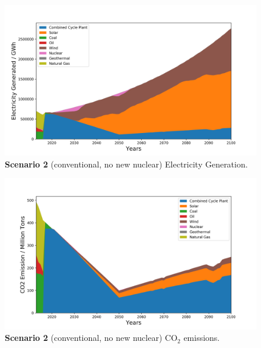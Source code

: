 \documentclass[final]{beamer}
\newlength{\onecolwid}
\begin{document}
\begin{frame}[t]
\begin{columns}
\begin{column}{\onecolwid}
\begin{figure}[H] 
\centering
\includegraphics[scale=1.1]{./plots/convNoNuc_ele.png}
\caption{\textbf{Scenario 2} (conventional, no new nuclear) Electricity Generation.}
\label{s2e}
\end{figure}

\begin{figure}[H] 
\centering
\includegraphics[scale=1.1]{./plots/convNoNuc_co2.png}
\caption{\textbf{Scenario 2} (conventional, no new nuclear) CO$_2$ emissions.}
\label{s2c}
\end{figure}



\end{column}
\end{columns}
\end{frame}
\end{document}
